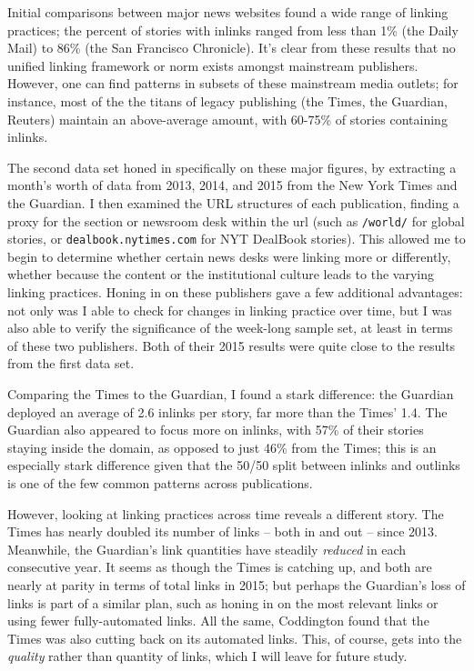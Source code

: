 Initial comparisons between major news websites found a wide range of linking practices; the percent of stories with inlinks ranged from less than 1\% (the Daily Mail) to 86\% (the San Francisco Chronicle). It's clear from these results that no unified linking framework or norm exists amongst mainstream publishers. However, one can find patterns in subsets of these mainstream media outlets; for instance, most of the the titans of legacy publishing (the Times, the Guardian, Reuters) maintain an above-average amount, with 60-75\% of stories containing inlinks.

The second data set honed in specifically on these major figures, by extracting a month's worth of data from 2013, 2014, and 2015 from the New York Times and the Guardian. I then examined the URL structures of each publication, finding a proxy for the section or newsroom desk within the url (such as \texttt{/world/} for global stories, or \texttt{dealbook.nytimes.com} for NYT DealBook stories). This allowed me to begin to determine whether certain news desks were linking more or differently, whether because the content or the institutional culture leads to the varying linking practices. Honing in on these publishers gave a few additional advantages: not only was I able to check for changes in linking practice over time, but I was also able to verify the significance of the week-long sample set, at least in terms of these two publishers. Both of their 2015 results were quite close to the results from the first data set.

Comparing the Times to the Guardian, I found a stark difference: the Guardian deployed an average of 2.6 inlinks per story, far more than the Times' 1.4. The Guardian also appeared to focus more on inlinks, with 57\% of their stories staying inside the domain, as opposed to just 46\% from the Times; this is an especially stark difference given that the 50/50 split between inlinks and outlinks is one of the few common patterns across publications.

However, looking at linking practices across time reveals a different story. The Times has nearly doubled its number of links -- both in and out -- since 2013. Meanwhile, the Guardian's link quantities have steadily \emph{reduced} in each consecutive year. It seems as though the Times is catching up, and both are nearly at parity in terms of total links in 2015; but perhaps the Guardian's loss of links is part of a similar plan, such as honing in on the most relevant links or using fewer fully-automated links. All the same, Coddington found that the Times was also cutting back on its automated links. This, of course, gets into the \emph{quality} rather than quantity of links, which I will leave for future study.

